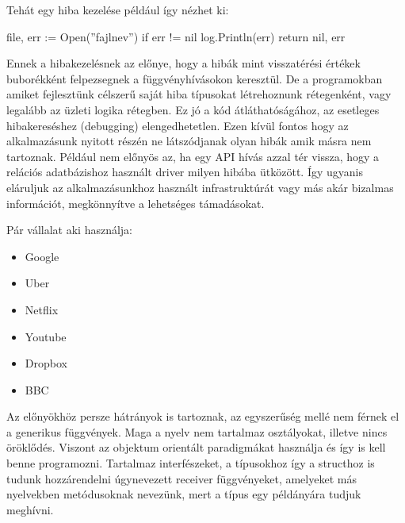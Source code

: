 Tehát egy hiba kezelése például így nézhet ki:
\begin{python}
    file, err := Open(''fajlnev'')
    if err != nil {
        log.Println(err)
        return nil, err
    }
\end{python}

Ennek a hibakezelésnek az előnye, hogy a hibák mint visszatérési értékek buborékként felpezsegnek a függvényhívásokon keresztül.
De a programokban amiket fejlesztünk célszerű saját hiba típusokat létrehoznunk rétegenként, vagy legalább az üzleti logika rétegben. Ez jó a kód átláthatóságához,
az esetleges hibakereséshez (debugging) elengedhetetlen. Ezen kívül fontos hogy az alkalmazásunk nyitott részén ne látszódjanak olyan hibák amik másra nem tartoznak. Például nem előnyös az, ha egy API hívás azzal tér vissza, hogy
a relációs adatbázishoz használt driver milyen hibába ütközött. Így ugyanis eláruljuk az alkalmazásunkhoz használt infrastruktúrát vagy más akár bizalmas információt, megkönnyítve a lehetséges támadásokat.

Pár vállalat aki használja:
\begin{itemize}
    \item Google
    \item Uber
    \item Netflix
    \item Youtube
    \item Dropbox
    \item BBC
\end{itemize}

Az előnyökhöz persze hátrányok is tartoznak, az egyszerűség mellé nem férnek el a generikus függvények.
Maga a nyelv nem tartalmaz osztályokat, illetve nincs öröklődés.
Viszont az objektum orientált paradigmákat használja és így is kell benne programozni.
Tartalmaz interfészeket, a típusokhoz így a structhoz is tudunk hozzárendelni úgynevezett receiver függvényeket, amelyeket más nyelvekben metódusoknak nevezünk, mert a típus egy példányára tudjuk meghívni.


